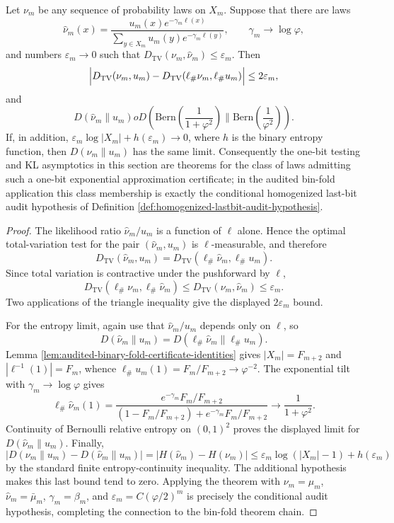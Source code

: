 \begin{theorem}\label{thm:lastbit-certificate-logical-scope-stability}
Let \(\nu_m\) be any sequence of probability laws on \(X_m\).  Suppose that there are laws
\[
\widehat\nu_m(x)=\frac{u_m(x)e^{-\gamma_m\ell(x)}}{\sum_{y\in X_m}u_m(y)e^{-\gamma_m\ell(y)}},
\qquad
\gamma_m\to\log\varphi,
\]
and numbers \(\varepsilon_m\to0\) such that \(D_{\mathrm{TV}}(\nu_m,\widehat\nu_m)\le\varepsilon_m\).  Then
\[
\Bigl|D_{\mathrm{TV}}(\nu_m,u_m)-D_{\mathrm{TV}}(\ell_\#\nu_m,\ell_\#u_m)\Bigr|
\le 2\varepsilon_m,
\]
and
\[
D(\widehat\nu_m\|u_m)	o
D\!\left(\mathrm{Bern}\!\left(\frac{1}{1+\varphi^2}\right)\Big\|\mathrm{Bern}\!\left(\frac{1}{\varphi^2}\right)\right).
\]
If, in addition, \(\varepsilon_m\log |X_m|+h(\varepsilon_m)\to0\), where \(h\) is the binary entropy function, then \(D(\nu_m\|u_m)\) has the same limit.  Consequently the one-bit testing and KL asymptotics in this section are theorems for the class of laws admitting such a one-bit exponential approximation certificate; in the audited bin-fold application this class membership is exactly the conditional homogenized last-bit audit hypothesis of Definition \ref{def:homogenized-lastbit-audit-hypothesis}.
\end{theorem}
\begin{proof}
The likelihood ratio \(\widehat\nu_m/u_m\) is a function of \(\ell\) alone.  Hence the optimal total-variation test for the pair \((\widehat\nu_m,u_m)\) is \(\ell\)-measurable, and therefore
\[
D_{\mathrm{TV}}(\widehat\nu_m,u_m)=D_{\mathrm{TV}}(\ell_\#\widehat\nu_m,\ell_\#u_m).
\]
Since total variation is contractive under the pushforward by \(\ell\),
\[
D_{\mathrm{TV}}(\ell_\#\nu_m,
\ell_\#\widehat\nu_m)
\le D_{\mathrm{TV}}(\nu_m,\widehat\nu_m)
\le\varepsilon_m.
\]
Two applications of the triangle inequality give the displayed \(2\varepsilon_m\) bound.

For the entropy limit, again use that \(\widehat\nu_m/u_m\) depends only on \(\ell\), so
\[
D(\widehat\nu_m\|u_m)=D(\ell_\#\widehat\nu_m\|\ell_\#u_m).
\]
Lemma \ref{lem:audited-binary-fold-certificate-identities} gives \(|X_m|=F_{m+2}\) and \(|\ell^{-1}(1)|=F_m\), whence \(\ell_\#u_m(1)=F_m/F_{m+2}\to\varphi^{-2}\).  The exponential tilt with \(\gamma_m\to\log\varphi\) gives
\[
\ell_\#\widehat\nu_m(1)
=\frac{e^{-\gamma_m}F_m/F_{m+2}}{(1-F_m/F_{m+2})+e^{-\gamma_m}F_m/F_{m+2}}
\longrightarrow \frac{1}{1+\varphi^2}.
\]
Continuity of Bernoulli relative entropy on \((0,1)^2\) proves the displayed limit for \(D(\widehat\nu_m\|u_m)\).  Finally,
\[
\bigl|D(\nu_m\|u_m)-D(\widehat\nu_m\|u_m)\bigr|
=|H(\widehat\nu_m)-H(\nu_m)|
\le \varepsilon_m\log(|X_m|-1)+h(\varepsilon_m)
\]
by the standard finite entropy-continuity inequality.  The additional hypothesis makes this last bound tend to zero.  Applying the theorem with \(\nu_m=\mu_m\), \(\widehat\nu_m=\bar\mu_m\), \(\gamma_m=\beta_m\), and \(\varepsilon_m=C(\varphi/2)^m\) is precisely the conditional audit hypothesis, completing the connection to the bin-fold theorem chain. \qedhere
\end{proof}

